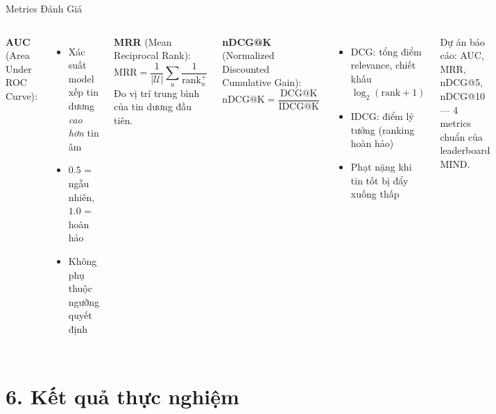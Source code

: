 \documentclass[aspectratio=169,11pt]{beamer}
\begin{document}
\begin{frame}{Metrics Đánh Giá}
  \begin{columns}[T]
      \textbf{AUC} (Area Under ROC Curve):
      \begin{itemize}
        \item Xác suất model xếp tin dương \textit{cao hơn} tin âm
        \item $0.5$ = ngẫu nhiên, $1.0$ = hoàn hảo
        \item Không phụ thuộc ngưỡng quyết định
      \end{itemize}

      \vspace{0.3em}
      \textbf{MRR} (Mean Reciprocal Rank):
      \[
        \text{MRR} = \frac{1}{|\mathcal{U}|}\sum_u \frac{1}{\text{rank}^+_u}
      \]
      Đo vị trí trung bình của tin dương đầu tiên.

      \textbf{nDCG@K} (Normalized Discounted Cumulative Gain):
      \[
        \text{nDCG@K} = \frac{\text{DCG@K}}{\text{IDCG@K}}
      \]
      \begin{itemize}
        \item DCG: tổng điểm relevance, chiết khấu $\log_2(\text{rank}+1)$
        \item IDCG: điểm lý tưởng (ranking hoàn hảo)
        \item Phạt nặng khi tin tốt bị đẩy xuống thấp
      \end{itemize}

      \vspace{0.3em}
      \begin{keybox}[]
        \footnotesize
        Dự án báo cáo: AUC, MRR,
        nDCG@5, nDCG@10\\
        --- 4 metrics chuẩn của leaderboard MIND.
      \end{keybox}
  \end{columns}
\end{frame}

\section{6. Kết quả thực nghiệm}
\end{document}
